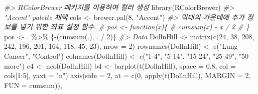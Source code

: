\documentclass[
]{article}
\newenvironment{Shaded}{\begin{snugshade}}{\end{snugshade}}
\newcommand{\AttributeTok}[1]{\textcolor[rgb]{0.77,0.63,0.00}{#1}}
\newcommand{\CommentTok}[1]{\textcolor[rgb]{0.56,0.35,0.01}{\textit{#1}}}
\newcommand{\DecValTok}[1]{\textcolor[rgb]{0.00,0.00,0.81}{#1}}
\newcommand{\FloatTok}[1]{\textcolor[rgb]{0.00,0.00,0.81}{#1}}
\newcommand{\FunctionTok}[1]{\textcolor[rgb]{0.00,0.00,0.00}{#1}}
\newcommand{\NormalTok}[1]{#1}
\newcommand{\OtherTok}[1]{\textcolor[rgb]{0.56,0.35,0.01}{#1}}
\newcommand{\SpecialCharTok}[1]{\textcolor[rgb]{0.00,0.00,0.00}{#1}}
\newcommand{\StringTok}[1]{\textcolor[rgb]{0.31,0.60,0.02}{#1}}
\begin{document}
\begin{Shaded}
\begin{Highlighting}[]
\CommentTok{\#\textgreater{} RColorBrewer 패키지를 이용하여 컬러 생성}
\FunctionTok{library}\NormalTok{(RColorBrewer)}
\CommentTok{\#\textgreater{} "Accent" palette 채택}
\NormalTok{cols }\OtherTok{\textless{}{-}} \FunctionTok{brewer.pal}\NormalTok{(}\DecValTok{8}\NormalTok{, }\StringTok{"Accent"}\NormalTok{)}
\CommentTok{\#\textgreater{} 막대의 가운데에 추가 정보를 넣기 위한 좌표 설정 함수. }
\CommentTok{\# pos \textless{}{-} function(x)\{}
\CommentTok{\#   cumsum(x) {-} x / 2}
\CommentTok{\# \}}
\NormalTok{pos }\OtherTok{\textless{}{-}}\NormalTok{ . }\SpecialCharTok{\%\textgreater{}\%}\NormalTok{ \{}\StringTok{\textasciigrave{}}\AttributeTok{{-}}\StringTok{\textasciigrave{}}\NormalTok{(}\FunctionTok{cumsum}\NormalTok{(.), . }\SpecialCharTok{/} \DecValTok{2}\NormalTok{)\}}
\CommentTok{\#\textgreater{} Data}
\NormalTok{DollnHill }\OtherTok{\textless{}{-}} \FunctionTok{matrix}\NormalTok{(}\FunctionTok{c}\NormalTok{(}\DecValTok{24}\NormalTok{, }\DecValTok{38}\NormalTok{, }\DecValTok{208}\NormalTok{, }\DecValTok{242}\NormalTok{, }\DecValTok{196}\NormalTok{, }\DecValTok{201}\NormalTok{, }\DecValTok{164}\NormalTok{, }\DecValTok{118}\NormalTok{, }\DecValTok{45}\NormalTok{, }\DecValTok{23}\NormalTok{),}
                    \AttributeTok{nrow =} \DecValTok{2}\NormalTok{)}
\FunctionTok{rownames}\NormalTok{(DollnHill) }\OtherTok{\textless{}{-}} \FunctionTok{c}\NormalTok{(}\StringTok{"Lung Cancer"}\NormalTok{, }\StringTok{"Control"}\NormalTok{)}
\FunctionTok{colnames}\NormalTok{(DollnHill) }\OtherTok{\textless{}{-}} \FunctionTok{c}\NormalTok{(}\StringTok{"1{-}4"}\NormalTok{, }\StringTok{"5{-}14"}\NormalTok{, }\StringTok{"15{-}24"}\NormalTok{, }\StringTok{"25{-}49"}\NormalTok{, }\StringTok{"50 more"}\NormalTok{)}
\NormalTok{c4 }\OtherTok{\textless{}{-}} \FunctionTok{ncol}\NormalTok{(DollnHill)}
\NormalTok{b4 }\OtherTok{\textless{}{-}} \FunctionTok{barplot}\NormalTok{(}\FunctionTok{t}\NormalTok{(DollnHill), }
              \AttributeTok{space =} \FloatTok{0.8}\NormalTok{, }
              \AttributeTok{col =}\NormalTok{ cols[}\DecValTok{1}\SpecialCharTok{:}\DecValTok{5}\NormalTok{], }
              \AttributeTok{yaxt =} \StringTok{"n"}\NormalTok{)}
\FunctionTok{axis}\NormalTok{(}\AttributeTok{side =} \DecValTok{2}\NormalTok{,}
     \AttributeTok{at =} \FunctionTok{c}\NormalTok{(}\DecValTok{0}\NormalTok{, }\FunctionTok{apply}\NormalTok{(}\FunctionTok{t}\NormalTok{(DollnHill), }
                     \AttributeTok{MARGIN =} \DecValTok{2}\NormalTok{, }
                     \AttributeTok{FUN =}\NormalTok{ cumsum)),}

\end{Highlighting}
\end{Shaded}
\end{document}

